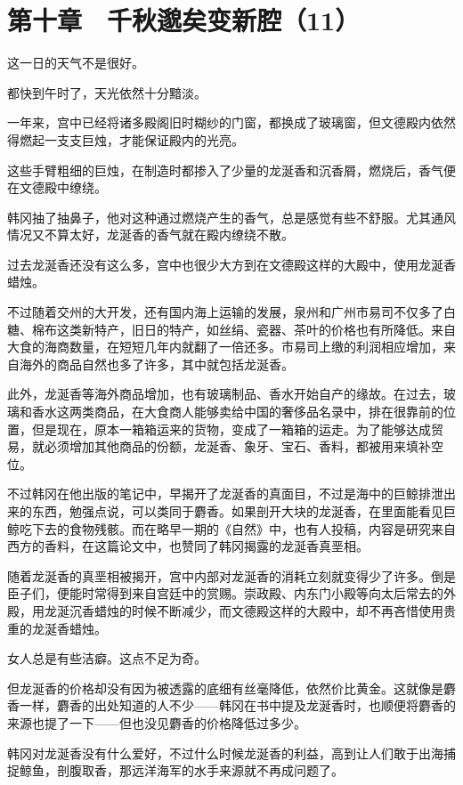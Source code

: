 \section{第十章　千秋邈矣变新腔（11）}

这一日的天气不是很好。

都快到午时了，天光依然十分黯淡。

一年来，宫中已经将诸多殿阁旧时糊纱的门窗，都换成了玻璃窗，但文德殿内依然得燃起一支支巨烛，才能保证殿内的光亮。

这些手臂粗细的巨烛，在制造时都掺入了少量的龙涎香和沉香屑，燃烧后，香气便在文德殿中缭绕。

韩冈抽了抽鼻子，他对这种通过燃烧产生的香气，总是感觉有些不舒服。尤其通风情况又不算太好，龙涎香的香气就在殿内缭绕不散。

过去龙涎香还没有这么多，宫中也很少大方到在文德殿这样的大殿中，使用龙涎香蜡烛。

不过随着交州的大开发，还有国内海上运输的发展，泉州和广州市易司不仅多了白糖、棉布这类新特产，旧日的特产，如丝绢、瓷器、茶叶的价格也有所降低。来自大食的海商数量，在短短几年内就翻了一倍还多。市易司上缴的利润相应增加，来自海外的商品自然也多了许多，其中就包括龙涎香。

此外，龙涎香等海外商品增加，也有玻璃制品、香水开始自产的缘故。在过去，玻璃和香水这两类商品，在大食商人能够卖给中国的奢侈品名录中，排在很靠前的位置，但是现在，原本一箱箱运来的货物，变成了一箱箱的运走。为了能够达成贸易，就必须增加其他商品的份额，龙涎香、象牙、宝石、香料，都被用来填补空位。

不过韩冈在他出版的笔记中，早揭开了龙涎香的真面目，不过是海中的巨鲸排泄出来的东西，勉强点说，可以类同于麝香。如果剖开大块的龙涎香，在里面能看见巨鲸吃下去的食物残骸。而在略早一期的《自然》中，也有人投稿，内容是研究来自西方的香料，在这篇论文中，也赞同了韩冈揭露的龙涎香真垩相。

随着龙涎香的真垩相被揭开，宫中内部对龙涎香的消耗立刻就变得少了许多。倒是臣子们，便能时常得到来自宫廷中的赏赐。崇政殿、内东门小殿等向太后常去的外殿，用龙涎沉香蜡烛的时候不断减少，而文德殿这样的大殿中，却不再吝惜使用贵重的龙涎香蜡烛。

女人总是有些洁癖。这点不足为奇。

但龙涎香的价格却没有因为被透露的底细有丝毫降低，依然价比黄金。这就像是麝香一样，麝香的出处知道的人不少——韩冈在书中提及龙涎香时，也顺便将麝香的来源也提了一下——但也没见麝香的价格降低过多少。

韩冈对龙涎香没有什么爱好，不过什么时候龙涎香的利益，高到让人们敢于出海捕捉鲸鱼，剖腹取香，那远洋海军的水手来源就不再成问题了。


